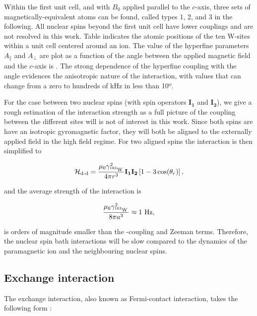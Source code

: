 Within the first unit cell, and with $B_0$ applied parallel to the $c$-axis, three sets of magnetically-equivalent \W atoms can be found, called types 1, 2, and 3 in the following. All \W nuclear spins beyond the first unit cell have lower couplings and are not resolved in this work. Table  indicates the atomic positions of the ten W-sites within a unit cell centered around an \Er ion. The value of the hyperfine parameters $A_\parallel$ and $A_\perp$ are plot as a function of the angle between the applied magnetic field and the $c$-axis is . The strong dependence of the hyperfine coupling with the angle evidences the anisotropic nature of the interaction, with values that can change from a zero to hundreds of kHz in less than 10º.

For the case between two \W nuclear spins (with spin operators $\mathbf{I_1}$ and $\mathbf{I_2}$), we give a rough estimation of the interaction strength as a full picture of the coupling between the different sites will is not of interest in this work. Since both spins are have an isotropic gyromagnetic factor, they will both be aligned to the externally applied field in the high field regime. For two aligned spins the interaction is then simplified to

\begin{equation}
    \mathcal{H}_{\text{d-d}} = \frac{\mu_0\gamma_{\text{$^{183}$W\,}}^2}{4\pi r^3}  \mathbf{I_1} \mathbf{I_2} \left[ 1 - 3\cos(\theta_r) \right],
\end{equation}

\noindent and the average strength of the interaction is

\begin{equation}
    \frac{\mu_0\gamma_{\text{$^{183}$W\,}}^2}{8\pi a^3} \approx 1\text{~Hz}, 
\end{equation} 

\noindent is orders of magnitude smaller than the \Er-\W coupling and Zeeman terms. Therefore, the nuclear spin bath interactions will be slow compared to the dynamics of the paramagnetic ion and the neighbouring nuclear spins.

\subsection{Exchange interaction}

The exchange interaction, also known as Fermi-contact interaction, takes the following form :

